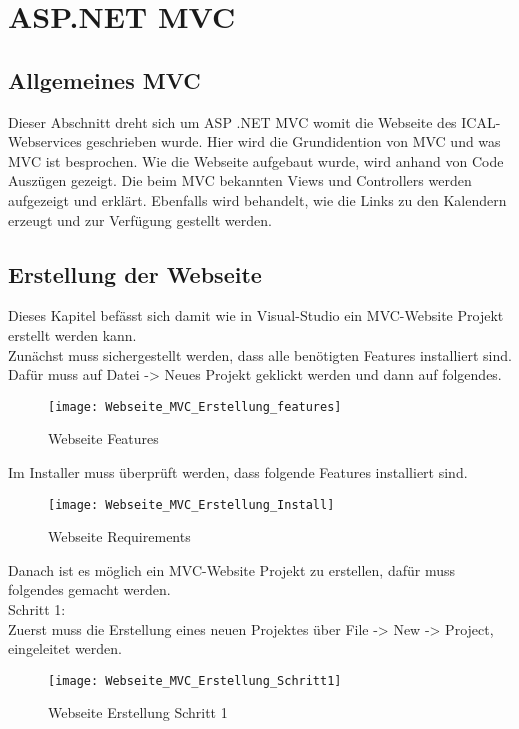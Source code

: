 {\chapter{ASP.NET MVC}
\label{sec:MVC}
\section{Allgemeines MVC}
\label{sec:allgemein}
Dieser Abschnitt dreht sich um ASP .NET MVC womit die Webseite des ICAL-Webservices geschrieben wurde. Hier wird die Grundidention von MVC und was MVC ist besprochen. Wie die Webseite aufgebaut wurde, wird anhand von Code Auszügen gezeigt. Die beim MVC bekannten Views und Controllers werden aufgezeigt und erklärt. Ebenfalls wird behandelt, wie die Links zu den Kalendern erzeugt und zur Verfügung gestellt werden. 
\section{Erstellung der Webseite}
\label{sec:erstellung_ws}
Dieses Kapitel befässt sich damit wie in Visual-Studio ein MVC-Website Projekt erstellt werden kann.\\
Zunächst muss sichergestellt werden, dass alle benötigten Features installiert sind. Dafür muss auf Datei -\textgreater{} Neues Projekt geklickt werden und dann auf folgendes.\\
\begin{figure}[H]
    \texttt{[image: Webseite\_MVC\_Erstellung\_features]}
    \caption{Webseite Features}
    \label{fig:webfeatures}
\end{figure}
Im Installer muss überprüft werden, dass folgende Features installiert sind.\\
\begin{figure}[H]
    \texttt{[image: Webseite\_MVC\_Erstellung\_Install]}
    \caption{Webseite Requirements}
    \label{fig:webinstall}
\end{figure}
Danach ist es möglich ein MVC-Website Projekt zu erstellen, dafür muss folgendes gemacht werden.\\
Schritt 1:\\
Zuerst muss die Erstellung eines neuen Projektes über File -\textgreater{} New -\textgreater{} Project, eingeleitet werden.\\
\begin{figure}[H]
    \texttt{[image: Webseite\_MVC\_Erstellung\_Schritt1]}
    \caption{Webseite Erstellung Schritt 1}
    \label{fig:weberstell1}
\end{figure}
}
